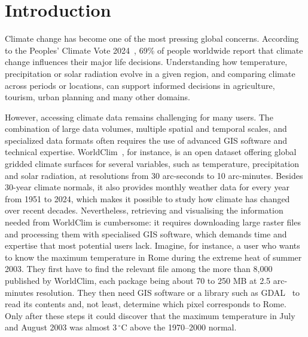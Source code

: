 \section{Introduction}\label{sec:introduction} %


Climate change has become one of the most pressing global concerns. According to the Peoples' 
Climate Vote 2024~\cite{flynn2024peoples}, 69\% of people worldwide report that climate 
change influences their major life decisions. Understanding how temperature,
precipitation or solar radiation evolve in a given region, and comparing climate across
periods or locations, can support informed decisions in agriculture, tourism, urban
planning and many other domains.

However, accessing climate data remains challenging for many users. The combination of large 
data volumes, multiple spatial and temporal scales, and specialized data formats often requires 
the use of advanced GIS software and technical expertise. 
WorldClim~\cite{worldclim}, for instance, is an open dataset offering global gridded
climate surfaces for several variables, such as temperature, precipitation and solar
radiation, at resolutions from 30 arc-seconds to 10 arc-minutes. Besides 30-year
climate normals, it also provides monthly weather data for every year from 1951 to 2024,
which makes it possible to study how climate has changed over recent decades.
Nevertheless, retrieving and visualising the information needed from WorldClim is
cumbersome: it requires downloading large raster files and processing them with
specialised GIS software, which demands time and expertise that most potential users
lack. Imagine, for instance, a user who wants to know the maximum temperature in Rome
during the extreme heat of summer 2003. They first have to find the relevant file among
the more than 8{,}000 published by WorldClim, each package being about 70 to 250 MB at 2.5 arc-minutes
resolution. They then need GIS software or a library such as
GDAL~\cite{mcinerney2015open} to read its contents and, not least, determine which
pixel corresponds to Rome. Only after these steps it could discover that the maximum
temperature in July and August 2003 was almost 3\,$^\circ$C above the 1970--2000 normal.

